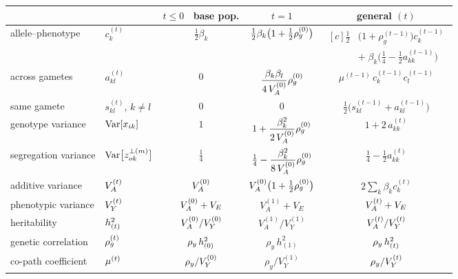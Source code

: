 \documentclass[12pt]{article}
\begin{document}
\begin{table}[H]
    \begin{floatcard}
    \renewcommand{\arraystretch}{2.1}
    \setlength{\tabcolsep}{2pt}
    \footnotesize
    \begin{tabular}{ll|ccc}
            & & $t \leq 0$ \ \footnotesize base pop. & $t = 1$ & general $(t)$ \\
        \hline
        allele--phenotype & $c^{(t)}_k$
            & $\tfrac12\beta_k$
            & $\tfrac12\beta_k\big(1 + \tfrac12\rho_g^{(0)}\big)$
            & $\begin{aligned}[c]
                   \tfrac12&\big(1 + \rho_g^{(t-1)}\big) c^{(t-1)}_k \\[-2pt]
                   &+\; \beta_k\Big(\tfrac14 - \tfrac12 a^{(t-1)}_{kk}\Big)
               \end{aligned}$ \\
        across gametes & $a^{(t)}_{kl}$
            & $0$
            & $\dfrac{\beta_k\beta_l}{4\,V_A^{(0)}}\rho_g^{(0)}$
            & $\mu^{(t-1)}\, c^{(t-1)}_k c^{(t-1)}_l$ \\
        same gamete & $s^{(t)}_{kl}$, $k \neq l$
            & $0$
            & $0$
            & $\tfrac12\big(s^{(t-1)}_{kl} + a^{(t-1)}_{kl}\big)$ \\
        \hline
        genotype variance & $\mathrm{Var}[x_{ik}]$
            & $1$
            & $1 + \dfrac{\beta_k^2}{2\,V_A^{(0)}}\rho_g^{(0)}$
            & $1 + 2\,a^{(t)}_{kk}$ \\
        segregation variance & $\mathrm{Var}\big[z^{\perp(m)}_{ok}\big]$
            & $\tfrac14$
            & $\tfrac14 - \dfrac{\beta_k^2}{8\,V_A^{(0)}}\rho_g^{(0)}$
            & $\tfrac14 - \tfrac12 a^{(t)}_{kk}$ \\
        additive variance & $V_A^{(t)}$
            & $V_A^{(0)}$
            & $V_A^{(0)}\big(1 + \tfrac12\rho_g^{(0)}\big)$
            & $2\sum_k \beta_k c^{(t)}_k$ \\
        phenotypic variance & $V_Y^{(t)}$
            & $V_A^{(0)} + V_E$
            & $V_A^{(1)} + V_E$
            & $V_A^{(t)} + V_E$ \\
        heritability & $h^2_{(t)}$
            & $V_A^{(0)}/V_Y^{(0)}$
            & $V_A^{(1)}/V_Y^{(1)}$
            & $V_A^{(t)}/V_Y^{(t)}$ \\
        genetic correlation & $\rho_g^{(t)}$
            & $\rho_y\,h^2_{(0)}$
            & $\rho_y\,h^2_{(1)}$
            & $\rho_y\,h^2_{(t)}$ \\
        co-path coefficient & $\mu^{(t)}$
            & $\rho_y/V_Y^{(0)}$
            & $\rho_y/V_Y^{(1)}$
            & $\rho_y/V_Y^{(t)}$ \\

\end{tabular}
\end{floatcard}
\end{table}
\end{document}
